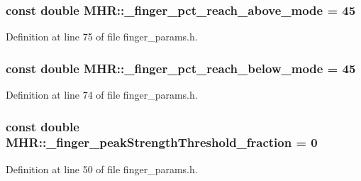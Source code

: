 \hypertarget{namespace_m_h_r_a8c272379feda002b512fbc5e3e917000}{
\subsubsection[{\+\_\+finger\+\_\+pct\+\_\+reach\+\_\+above\+\_\+mode}]{\setlength{\rightskip}{0pt plus 5cm}const double M\+H\+R\+::\+\_\+finger\+\_\+pct\+\_\+reach\+\_\+above\+\_\+mode = 45}}\label{namespace_m_h_r_a8c272379feda002b512fbc5e3e917000}


Definition at line 75 of file finger\+\_\+params.\+h.

\hypertarget{namespace_m_h_r_a9714df3caf979755314e0a049dd96368}{
\subsubsection[{\+\_\+finger\+\_\+pct\+\_\+reach\+\_\+below\+\_\+mode}]{\setlength{\rightskip}{0pt plus 5cm}const double M\+H\+R\+::\+\_\+finger\+\_\+pct\+\_\+reach\+\_\+below\+\_\+mode = 45}}\label{namespace_m_h_r_a9714df3caf979755314e0a049dd96368}


Definition at line 74 of file finger\+\_\+params.\+h.

\hypertarget{namespace_m_h_r_a417e8c2df65251a5a34b250f975a3867}{
\subsubsection[{\+\_\+finger\+\_\+peak\+Strength\+Threshold\+\_\+fraction}]{\setlength{\rightskip}{0pt plus 5cm}const double M\+H\+R\+::\+\_\+finger\+\_\+peak\+Strength\+Threshold\+\_\+fraction = 0}}\label{namespace_m_h_r_a417e8c2df65251a5a34b250f975a3867}


Definition at line 50 of file finger\+\_\+params.\+h.

